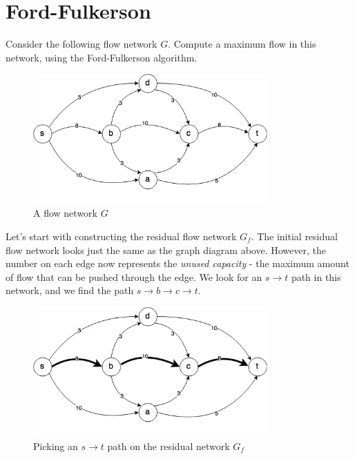 \documentclass{article}
\begin{document}
\section{Ford-Fulkerson}
Consider the following flow network $G$.
Compute a maximum flow in this network, using the Ford-Fulkerson
algorithm.

\begin{figure}[H]
\centering
\includegraphics[width=0.8\textwidth]{g_0.png}
\caption{A flow network $G$}
\end{figure}

Let's start with constructing the residual flow network $G_f$.
The initial residual flow network looks just the same as the graph diagram
above. However, the number on each edge now represents the {\it unused
capacity} - the maximum amount of flow that can be pushed through the edge.
We look for an $s \rightarrow t$ path in this network, and
we find the path $s \rightarrow b \rightarrow c \rightarrow t$.

\begin{figure}[H]
\centering
\includegraphics[width=0.8\textwidth]{gf_0.png}
\caption{Picking an $s \rightarrow t$ path on the residual network $G_f$}
\end{figure}
\end{document}
